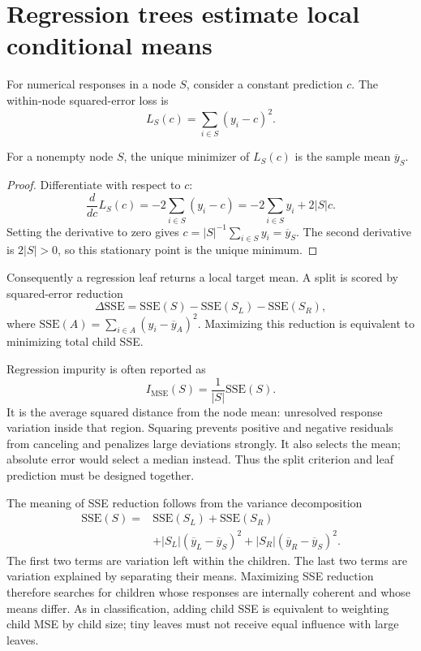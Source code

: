 
\section{Regression trees estimate local conditional means}

For numerical responses in a node $S$, consider a constant prediction $c$.
The within-node squared-error loss is
\[
  L_S(c)=\sum_{i\in S}(y_i-c)^2.
\]

\begin{theorem}
For a nonempty node $S$, the unique minimizer of $L_S(c)$ is the sample mean
$\overline y_S$.
\end{theorem}

\begin{proof}
Differentiate with respect to $c$:
\[
  \frac{d}{dc}L_S(c)=-2\sum_{i\in S}(y_i-c)
  =-2\sum_{i\in S}y_i+2|S|c.
\]
Setting the derivative to zero gives
$c=|S|^{-1}\sum_{i\in S}y_i=\overline y_S$. The second derivative is
$2|S|>0$, so this stationary point is the unique minimum.
\end{proof}

Consequently a regression leaf returns a local target mean. A split is scored
by squared-error reduction
\[
  \Delta\mathrm{SSE}
  =\mathrm{SSE}(S)-\mathrm{SSE}(S_L)-\mathrm{SSE}(S_R),
\]
where
$\mathrm{SSE}(A)=\sum_{i\in A}(y_i-\overline y_A)^2$. Maximizing this
reduction is equivalent to minimizing total child SSE.

Regression impurity is often reported as
\[
  I_{\mathrm{MSE}}(S)=\frac{1}{|S|}\mathrm{SSE}(S).
\]
It is the average squared distance from the node mean: unresolved response
variation inside that region. Squaring prevents positive and negative residuals
from canceling and penalizes large deviations strongly. It also selects the
mean; absolute error would select a median instead. Thus the split criterion and
leaf prediction must be designed together.

The meaning of SSE reduction follows from the variance decomposition
\[
\begin{split}
\mathrm{SSE}(S)={}&\mathrm{SSE}(S_L)+\mathrm{SSE}(S_R)\\
&+|S_L|(\overline y_L-\overline y_S)^2
+|S_R|(\overline y_R-\overline y_S)^2.
\end{split}
\]
The first two terms are variation left within the children. The last two terms
are variation explained by separating their means. Maximizing SSE reduction
therefore searches for children whose responses are internally coherent and
whose means differ. As in classification, adding child SSE is equivalent to
weighting child MSE by child size; tiny leaves must not receive equal influence
with large leaves.

